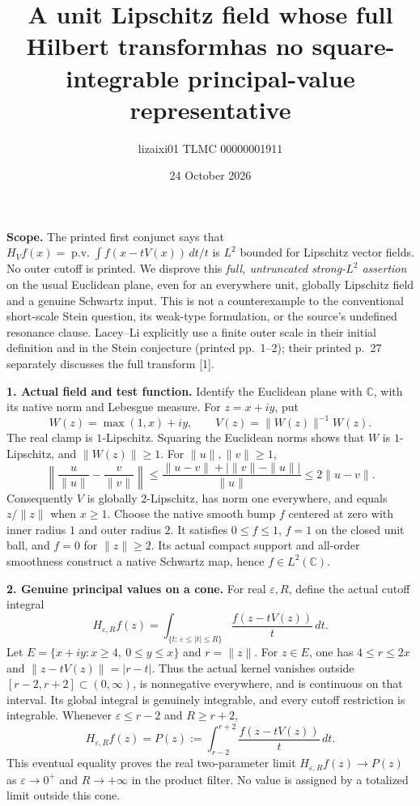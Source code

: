 \documentclass[10pt,a4paper]{article}
\title{A unit Lipschitz field whose full Hilbert transform\newline has no square-integrable principal-value representative}
\author{lizaixi01 \qquad TLMC 00000001911}
\date{24 October 2026}
\newcommand{\C}{\mathbb C}
\begin{document}
\maketitle
\vspace{-6mm}

\textbf{Scope.} The printed first conjunct says that
$H_Vf(x)=\operatorname{p.v.}\int f(x-tV(x))\,dt/t$
is $L^2$ bounded for Lipschitz vector fields. No outer cutoff is printed.
We disprove this \emph{full, untruncated strong-$L^2$ assertion} on the usual
Euclidean plane, even for an everywhere unit, globally Lipschitz field and
a genuine Schwartz input. This is not a counterexample to the conventional
short-scale Stein question, its weak-type formulation, or the source's
undefined resonance clause. Lacey--Li explicitly use a finite outer scale
in their initial definition and in the Stein conjecture (printed pp.~1--2);
their printed p.~27 separately discusses the full transform [1].

\textbf{1. Actual field and test function.}
Identify the Euclidean plane with $\C$, with its native norm and Lebesgue measure.
For $z=x+iy$, put
\[
 W(z)=\max(1,x)+iy,\qquad V(z)=\|W(z)\|^{-1}W(z).
\]
The real clamp is $1$-Lipschitz. Squaring the Euclidean norms shows that
$W$ is $1$-Lipschitz, and $\|W(z)\|\ge1$. For $\|u\|,\|v\|\ge1$,
\[
 \left\|\frac{u}{\|u\|}-\frac{v}{\|v\|}\right\|
 \le \frac{\|u-v\|+|\|v\|-\|u\||}{\|u\|}
 \le2\|u-v\|.
\]
Consequently $V$ is globally $2$-Lipschitz, has norm one everywhere,
and equals $z/\|z\|$ when $x\ge1$.
Choose the native smooth bump $f$ centered at zero with inner radius $1$
and outer radius $2$. It satisfies $0\le f\le1$, $f=1$ on the closed unit ball,
and $f=0$ for $\|z\|\ge2$. Its actual compact support and all-order smoothness
construct a native Schwartz map, hence $f\in L^2(\C)$.

\textbf{2. Genuine principal values on a cone.}
For real $\varepsilon,R$, define the actual cutoff integral
\[
 H_{\varepsilon,R}f(z)=
 \int_{\{t:\,\varepsilon\le |t|\le R\}}
       \frac{f(z-tV(z))}{t}\,dt.
\]
Let $E=\{x+iy:x\ge4,\ 0\le y\le x\}$ and $r=\|z\|$.
For $z\in E$, one has $4\le r\le2x$ and
$\|z-tV(z)\|=|r-t|$. Thus the actual kernel vanishes outside
$[r-2,r+2]\subset(0,\infty)$, is nonnegative everywhere, and is continuous
on that interval. Its global integral is genuinely integrable, and every
cutoff restriction is integrable. Whenever $\varepsilon\le r-2$ and $R\ge r+2$,
\[
 H_{\varepsilon,R}f(z)=P(z):=
 \int_{r-2}^{r+2}\frac{f(z-tV(z))}{t}\,dt.
\]
This eventual equality proves the real two-parameter limit
$H_{\varepsilon,R}f(z)\to P(z)$ as
$\varepsilon\to0^+$ and $R\to+\infty$ in the product filter.
No value is assigned by a totalized limit outside this cone.
\end{document}
